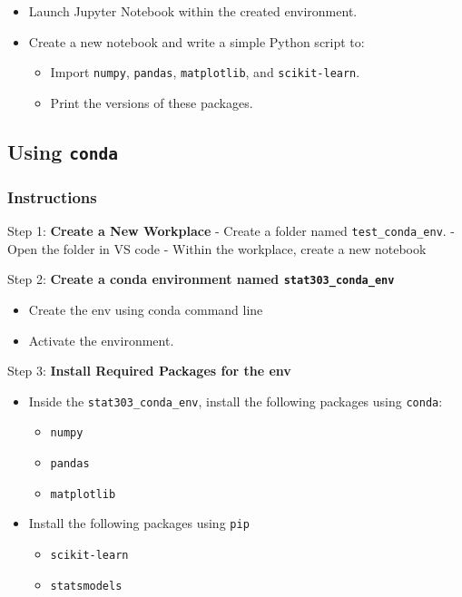 \documentclass[
  letterpaper,
  DIV=11,
  numbers=noendperiod]{scrreprt}
\providecommand{\tightlist}{%
  \setlength{\itemsep}{0pt}\setlength{\parskip}{0pt}}\usepackage{longtable,booktabs,array}
\begin{document}
\begin{itemize}
\tightlist
\item
  Launch Jupyter Notebook within the created environment.
\item
  Create a new notebook and write a simple Python script to:

  \begin{itemize}
  \tightlist
  \item
    Import \texttt{numpy}, \texttt{pandas}, \texttt{matplotlib}, and
    \texttt{scikit-learn}.
  \item
    Print the versions of these packages.
  \end{itemize}
\end{itemize}

\hypertarget{using-conda}{%
\subsection{\texorpdfstring{Using
\texttt{conda}}{Using conda}}\label{using-conda}}

\hypertarget{instructions-1}{%
\subsubsection{Instructions}\label{instructions-1}}

Step 1: \textbf{Create a New Workplace} - Create a folder named
\texttt{test\_conda\_env}. - Open the folder in VS code - Within the
workplace, create a new notebook

Step 2: \textbf{Create a conda environment named
\texttt{stat303\_conda\_env}}

\begin{itemize}
\tightlist
\item
  Create the env using conda command line
\item
  Activate the environment.
\end{itemize}

Step 3: \textbf{Install Required Packages for the env}

\begin{itemize}
\tightlist
\item
  Inside the \texttt{stat303\_conda\_env}, install the following
  packages using \texttt{conda}:

  \begin{itemize}
  \tightlist
  \item
    \texttt{numpy}
  \item
    \texttt{pandas}
  \item
    \texttt{matplotlib}
  \end{itemize}
\item
  Install the following packages using \texttt{pip}

  \begin{itemize}
  \tightlist
  \item
    \texttt{scikit-learn}
  \item
    \texttt{statsmodels}
  \end{itemize}
\end{itemize}
\end{document}
